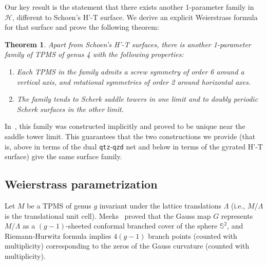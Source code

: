 \documentclass[a4paper]{amsart}
\newcommand{\C}{\mathbb{C}}
\newcommand{\re}{\operatorname{Re}}
\theoremstyle{plain}
\newtheorem{theorem}{Theorem}[section]
\theoremstyle{definition}
\def \cH {\mathcal{H}}
\begin{document}
Our key result is the statement that there exists another 1-parameter family in
$\cH$, different to Schoen's H'-T surface. We derive an explicit Weierstrass
formula for that surface and prove the following theorem:

\begin{theorem}\label{thm:main}
	Apart from Schoen's H'-T surfaces, there is another 1-parameter family of
	TPMS of genus 4 with the following properties:
	\begin{enumerate}
	  \item Each TPMS in the family admits a screw symmetry of order 6 around a
			vertical axis, and rotational symmetries of order 2 around horizontal
			axes.

		\item The family tends to Scherk saddle towers in one limit and to doubly
			periodic Scherk surfaces in the other limit. 
	\end{enumerate}
\end{theorem}

In~\cite{chen2024}, this family was constructed implicitly and proved to be
unique near the saddle tower limit.  This guarantees that the two constructions
we provide (that is, above in terms of the dual \texttt{qtz}-\texttt{qzd} net
and below in terms of the gyrated H'-T surface) give the same surface family.

\subsection{Weierstrass parametrization}\label{sec:weierstrass}

Let $M$ be a TPMS of genus $g$ invariant under the lattice translations
$\Lambda$ (i.e., $M/\Lambda$ is the translational unit cell).
Meeks~\cite{meeks1990} proved that the Gauss map $G$ represents $M/\Lambda$ as
a $(g-1)$-sheeted conformal branched cover of the sphere $\mathbb{S}^2$, and
Riemann-Hurwitz formula implies $4(g-1)$ branch points (counted with
multiplicity) corresponding to the zeros of the Gauss curvature (counted with
multiplicity).

\end{document}
